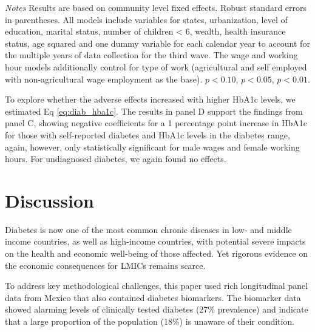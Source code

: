 \documentclass[10pt,letterpaper]{article}
\begin{document}
\begin{table}[!ht]
\begin{center}
\begin{adjustbox}{max width=\linewidth}
\begin{threeparttable}
{\begin{tablenotes}
						\item \footnotesize \textit{Notes} Results are based on community level fixed effects. Robust standard errors in parentheses. All models include variables for  states, urbanization, level of education, marital status, number of children < 6, wealth, health insurance status, age squared and one dummy variable for each calendar year to account for the multiple years of data collection for the third wave. The wage and working hour models additionally control for type of work (agricultural and self employed with non-agricultural wage employment as the base). \sym{*} \(p<0.10\), \sym{**} \(p<0.05\), \sym{***} \(p<0.01\).
					\end{tablenotes}
				}
			\end{threeparttable}
		\end{adjustbox}
	\end{center}
\end{table}

\clearpage

To explore whether the adverse effects increased with higher  \ac{HbA1c} levels, we estimated Eq \ref{eq:diab_hba1c}. The results in panel D support the findings from panel C, showing negative coefficients for a 1 percentage point increase in \ac{HbA1c} for those with self-reported diabetes and \ac{HbA1c} levels in the diabetes range, again, however, only statistically significant for male wages and female working hours. For undiagnosed diabetes, we again found no effects.

\section*{\label{sec:cha_4_conclusion}Discussion}

Diabetes is now one of the most common chronic diseases in low- and middle income countries, as well as high-income countries, with potential severe impacts on the health and economic well-being of those affected.  Yet rigorous evidence on the economic consequences for \acp{LMIC} remains scarce.

To address key methodological challenges, this paper used rich longitudinal panel data from Mexico that also contained diabetes biomarkers. The biomarker data showed alarming levels of clinically tested diabetes (27\% prevalence) and indicate that a large proportion of the population (18\%) is unaware of their condition.
\end{document}

